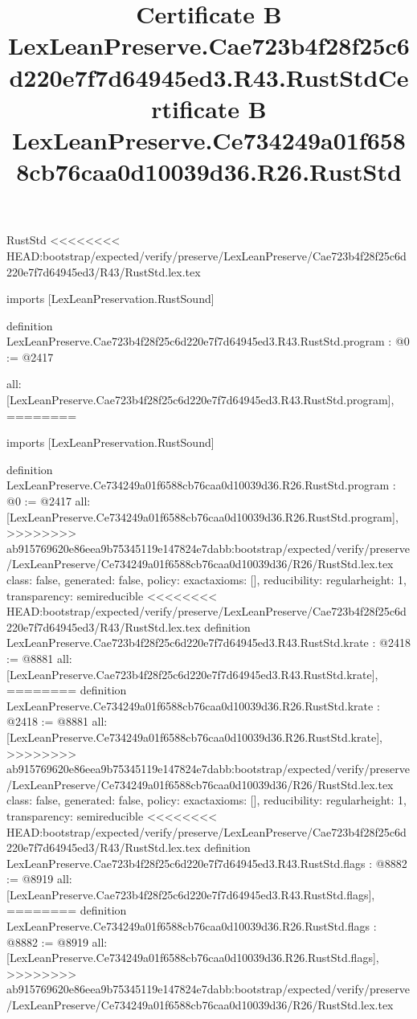 \begin{lexlean}{RustStd}
<<<<<<<< HEAD:bootstrap/expected/verify/preserve/LexLeanPreserve/Cae723b4f28f25c6d220e7f7d64945ed3/R43/RustStd.lex.tex
\title{Certificate B LexLeanPreserve.Cae723b4f28f25c6d220e7f7d64945ed3.R43.RustStd}
\begin{coremodule}
imports [LexLeanPreservation.RustSound]

definition LexLeanPreserve.Cae723b4f28f25c6d220e7f7d64945ed3.R43.RustStd.program : @0 := @2417 {
  all: [LexLeanPreserve.Cae723b4f28f25c6d220e7f7d64945ed3.R43.RustStd.program],
========
\title{Certificate B LexLeanPreserve.Ce734249a01f6588cb76caa0d10039d36.R26.RustStd}
\begin{coremodule}
imports [LexLeanPreservation.RustSound]

definition LexLeanPreserve.Ce734249a01f6588cb76caa0d10039d36.R26.RustStd.program : @0 := @2417 {
  all: [LexLeanPreserve.Ce734249a01f6588cb76caa0d10039d36.R26.RustStd.program],
>>>>>>>> ab915769620e86eea9b75345119e147824e7dabb:bootstrap/expected/verify/preserve/LexLeanPreserve/Ce734249a01f6588cb76caa0d10039d36/R26/RustStd.lex.tex
  class: false,
  generated: false,
  policy: exact{axioms: []},
  reducibility: regular{height: 1},
  transparency: semireducible
}
<<<<<<<< HEAD:bootstrap/expected/verify/preserve/LexLeanPreserve/Cae723b4f28f25c6d220e7f7d64945ed3/R43/RustStd.lex.tex
definition LexLeanPreserve.Cae723b4f28f25c6d220e7f7d64945ed3.R43.RustStd.krate : @2418 := @8881 {
  all: [LexLeanPreserve.Cae723b4f28f25c6d220e7f7d64945ed3.R43.RustStd.krate],
========
definition LexLeanPreserve.Ce734249a01f6588cb76caa0d10039d36.R26.RustStd.krate : @2418 := @8881 {
  all: [LexLeanPreserve.Ce734249a01f6588cb76caa0d10039d36.R26.RustStd.krate],
>>>>>>>> ab915769620e86eea9b75345119e147824e7dabb:bootstrap/expected/verify/preserve/LexLeanPreserve/Ce734249a01f6588cb76caa0d10039d36/R26/RustStd.lex.tex
  class: false,
  generated: false,
  policy: exact{axioms: []},
  reducibility: regular{height: 1},
  transparency: semireducible
}
<<<<<<<< HEAD:bootstrap/expected/verify/preserve/LexLeanPreserve/Cae723b4f28f25c6d220e7f7d64945ed3/R43/RustStd.lex.tex
definition LexLeanPreserve.Cae723b4f28f25c6d220e7f7d64945ed3.R43.RustStd.flags : @8882 := @8919 {
  all: [LexLeanPreserve.Cae723b4f28f25c6d220e7f7d64945ed3.R43.RustStd.flags],
========
definition LexLeanPreserve.Ce734249a01f6588cb76caa0d10039d36.R26.RustStd.flags : @8882 := @8919 {
  all: [LexLeanPreserve.Ce734249a01f6588cb76caa0d10039d36.R26.RustStd.flags],
>>>>>>>> ab915769620e86eea9b75345119e147824e7dabb:bootstrap/expected/verify/preserve/LexLeanPreserve/Ce734249a01f6588cb76caa0d10039d36/R26/RustStd.lex.tex
}}}
\end{coremodule}}
\end{coremodule}
\end{lexlean}
